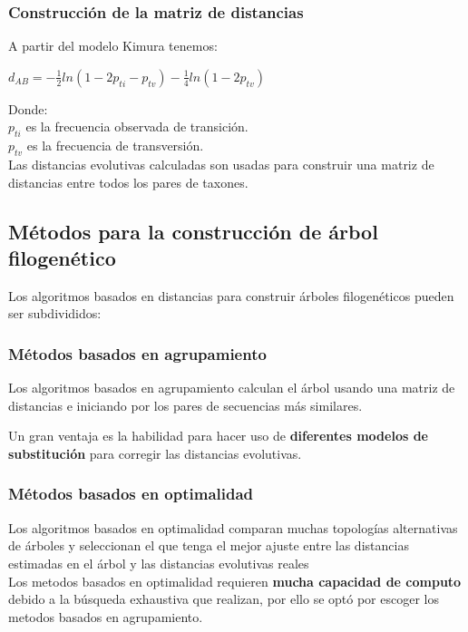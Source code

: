 \documentclass[a4paper]{article}
\begin{document}
\subsubsection{Construcción de la matriz de distancias}
A partir del modelo Kimura tenemos:\\
\begin{center}
	$d_{AB} = −\frac{1}{2} ln(1 − 2p_{ti} − p_{tv}) − \frac{1}{4} ln(1 − 2p_{tv})$
	
\end{center}

\noindent Donde:\\
$p_{ti}$ es la frecuencia observada de transición.\\
$p_{tv}$ es la frecuencia de transversión.\\

\noindent Las distancias evolutivas calculadas son usadas para construir una matriz de distancias entre todos los pares de taxones.

\subsection{Métodos para la construcción de árbol filogenético}	

Los algoritmos basados en distancias para construir árboles
filogenéticos pueden ser subdivididos:

\subsubsection*{Métodos basados en agrupamiento}

Los algoritmos basados en agrupamiento calculan el árbol
usando una matriz de distancias e iniciando por los pares de
secuencias más similares.

\noindent Un gran ventaja es la habilidad para hacer uso de \textbf{diferentes modelos de substitución} para corregir las distancias evolutivas.

\subsubsection*{Métodos basados en optimalidad}

Los algoritmos basados en optimalidad comparan muchas
topologías alternativas de árboles y seleccionan el que tenga el mejor ajuste entre las distancias estimadas en el árbol y las distancias evolutivas reales
\\

\noindent Los metodos basados en optimalidad requieren \textbf{mucha capacidad de computo} debido a la búsqueda exhaustiva que realizan, por ello se optó por escoger los metodos basados en agrupamiento.
\end{document}

